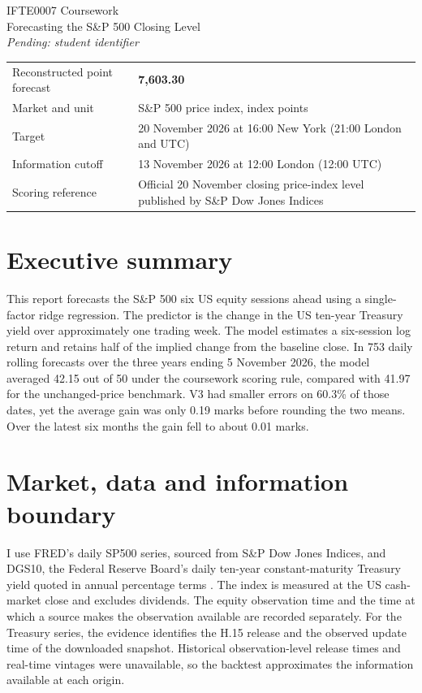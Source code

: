 \documentclass[11pt,a4paper]{article}
\newcommand{\pending}[1]{\textit{Pending: #1}}
\newcommand{\forecastvalue}{7,603.30}
\newcommand{\authorid}{\pending{student identifier}}
\begin{document}
\begin{center}
{\Large IFTE0007 Coursework}\\[5pt]
{\LARGE Forecasting the S\&P 500 Closing Level}\\[6pt]
\authorid
\end{center}

\begin{tabularx}{\linewidth}{@{}lX@{}}
\toprule
Reconstructed point forecast & \textbf{\forecastvalue}\\
Market and unit & S\&P 500 price index, index points\\
Target & 20 November 2026 at 16:00 New York (21:00 London and UTC)\\
Information cutoff & 13 November 2026 at 12:00 London (12:00 UTC)\\
Scoring reference & Official 20 November closing price-index level published by S\&P Dow Jones Indices \cite{brief,spdj}\\
\bottomrule
\end{tabularx}

\section{Executive summary}
This report forecasts the S\&P 500 six US equity sessions ahead using a single-factor ridge regression. The predictor is the change in the US ten-year Treasury yield over approximately one trading week. The model estimates a six-session log return and retains half of the implied change from the baseline close. In 753 daily rolling forecasts over the three years ending 5 November 2026, the model averaged 42.15 out of 50 under the coursework scoring rule, compared with 41.97 for the unchanged-price benchmark. V3 had smaller errors on 60.3\% of those dates, yet the average gain was only 0.19 marks before rounding the two means. Over the latest six months the gain fell to about 0.01 marks.

\section{Market, data and information boundary}
I use FRED's daily SP500 series, sourced from S\&P Dow Jones Indices, and DGS10, the Federal Reserve Board's daily ten-year constant-maturity Treasury yield quoted in annual percentage terms \cite{sp500,dgs10}. The index is measured at the US cash-market close and excludes dividends. The equity observation time and the time at which a source makes the observation available are recorded separately. For the Treasury series, the evidence identifies the H.15 release and the observed update time of the downloaded snapshot. Historical observation-level release times and real-time vintages were unavailable, so the backtest approximates the information available at each origin.
\end{document}
